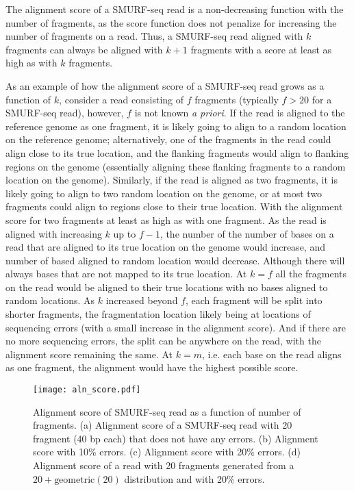 The alignment score of a SMURF-seq read is a non-decreasing function
with the number of fragments, as the score function does not penalize
for increasing the number of fragments on a read. Thus, a SMURF-seq read
aligned with $k$ fragments can always be aligned with $k+1$ fragments
with a score at least as high as with $k$ fragments.

As an example of how the alignment score of a SMURF-seq read grows as a
function of $k$, consider a read consisting of $f$ fragments (typically
$f > 20$ for a SMURF-seq read), however, $f$ is not known \emph{a priori}.
If the read is aligned to the reference genome as one fragment, it is
likely going to align to a random location on the reference genome;
alternatively, one of the fragments in the read could align close to its
true location, and the flanking fragments would align to flanking
regions on the genome (essentially aligning these flanking fragments to
a random location on the genome).
Similarly, if the read is aligned as two fragments, it is likely going
to align to two random location on the genome, or at most two fragments
could align to regions close to their true location. With the alignment
score for two fragments at least as high as with one fragment.
As the read is aligned with increasing $k$ up to $f-1$, the number of
the number of bases on a read that are aligned to its true location on
the genome would increase, and number of based aligned to random location
would decrease. Although there will always bases that are not mapped to
its true location.
At $k=f$ all the fragments on the read would be aligned to their true
locations with no bases aligned to random locations.
As $k$ increased beyond $f$, each fragment will be split into shorter
fragments, the fragmentation location likely being at locations of
sequencing errors (with a small increase in the alignment score). And if
there are no more sequencing errors, the split can be anywhere on the
read, with the alignment score remaining the same.
At $k=m$, i.e. each base on the read aligns as one fragment, the
alignment would have the highest possible score.

\begin{figure}[t!]
\centering
\texttt{[image: aln\_score.pdf]}
\caption[Alignment score of SMURF-seq read as a function of number of
  fragments]{
  Alignment score of SMURF-seq read as a function of number of
  fragments.
  (a) Alignment score of a SMURF-seq read with 20 fragment (40 bp each)
  that does not have any errors.
  (b) Alignment score with 10\% errors.
  (c) Alignment score with 20\% errors.
  (d) Alignment score of a read with 20 fragments generated from a $20 +
  \text{geometric}(20)$ distribution and with 20\% errors.}
\label{aln_score}
\end{figure}

